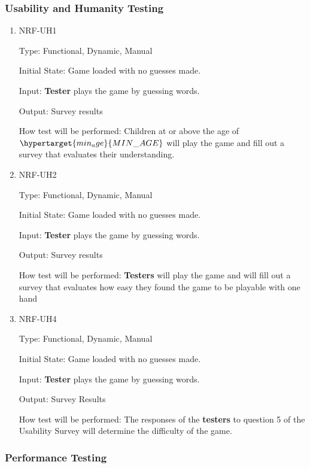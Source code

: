 \documentclass[12pt, titlepage]{article}
\begin{document}
\subsubsection{Usability and Humanity Testing}

\begin{enumerate}

\item{NRF-UH1\\}

Type: Functional, Dynamic, Manual
					
Initial State: Game loaded with no guesses made. 
					
Input: \textbf{Tester} plays the game by guessing words.
					
Output: Survey results
					
How test will be performed: Children at or above the age of $\hypertarget{min_age}{MIN\_AGE}$ 
will play the game and fill out a survey that evaluates their understanding.

\item{NRF-UH2\\}

Type: Functional, Dynamic, Manual
					
Initial State: Game loaded with no guesses made. 
					
Input: \textbf{Tester} plays the game by guessing words.
					
Output: Survey results
					
How test will be performed: \textbf{Testers} will play the 
game and will fill out a survey that evaluates how easy they 
found the game to be playable with one hand

\item{NRF-UH4\\}

Type: Functional, Dynamic, Manual
					
Initial State: Game loaded with no guesses made. 
					
Input: \textbf{Tester} plays the game by guessing words.
					
Output: Survey Results
					
How test will be performed: The responses of the \textbf{testers} 
to question 5 of the Usability Survey will determine the difficulty of the game. 

\end{enumerate}

\subsubsection{Performance Testing}
\end{document}
